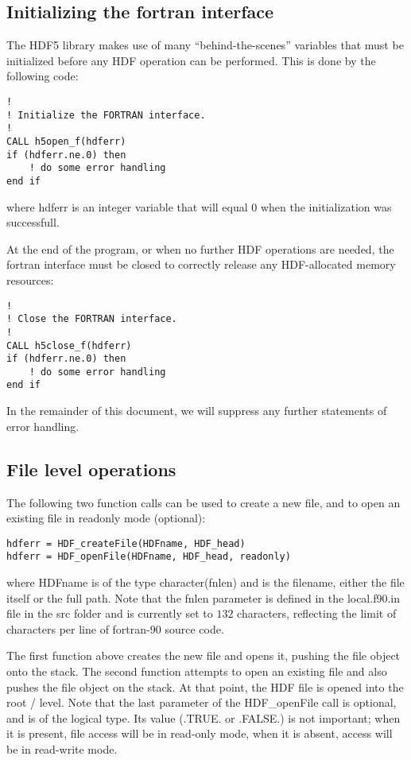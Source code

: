 \documentclass[DIV=calc, paper=letter, fontsize=11pt]{scrartcl}	 %
\begin{document}
\subsection{Initializing the fortran interface}
The HDF5 library makes use of many ``behind-the-scenes'' variables that must be initialized before
any HDF operation can be performed. This is done by the following code:
\begin{verbatim}
!
! Initialize the FORTRAN interface.
!
CALL h5open_f(hdferr)
if (hdferr.ne.0) then
    ! do some error handling
end if
\end{verbatim}
where \textsf{hdferr} is an integer variable that will equal $0$ when the initialization was successfull.

At the end of the program, or when no further HDF operations are needed, the fortran interface must be 
closed to correctly release any HDF-allocated memory resources:
\begin{verbatim}
!
! Close the FORTRAN interface.
!
CALL h5close_f(hdferr)
if (hdferr.ne.0) then
    ! do some error handling
end if
\end{verbatim}
In the remainder of this document, we will suppress any further statements of error handling.


\subsection{File level operations}
The following two function calls can be used to create a new file, and to open an existing file in readonly mode (optional):
\begin{verbatim}
hdferr = HDF_createFile(HDFname, HDF_head)
hdferr = HDF_openFile(HDFname, HDF_head, readonly)
\end{verbatim}
where \textsf{HDFname} is of the type \textsf{character(fnlen)} and is the filename, either the file itself or the full path.
Note that the \textsf{fnlen} parameter is defined in the \textsf{local.f90.in} file in the \textsf{src} folder and is currently set
to $132$ characters, reflecting the limit of characters per line of fortran-90 source code.

The first function above creates the new file and opens it, pushing the file object onto the stack.  The second function
attempts to open an existing file and also pushes the file object on the stack.  At that point, the HDF file is opened into
the root \textsf{/} level.  Note that the last parameter of the \textsf{HDF\_openFile} call is optional, and is of the \textsf{logical} type.
Its value (.TRUE. or .FALSE.) is not important; when it is present, file access will be in read-only mode, when it is absent, access will be in read-write mode.
\end{document}

